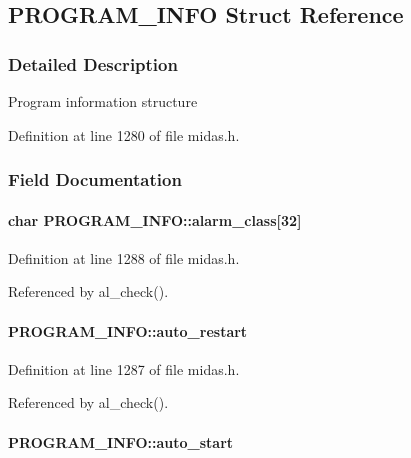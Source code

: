 \subsection{PROGRAM\_\-INFO Struct Reference}
\label{structPROGRAM__INFO}


\subsubsection{Detailed Description}
Program information structure 

Definition at line 1280 of file midas.h.

\subsubsection{Field Documentation}
\paragraph[{alarm\_\-class}]{\setlength{\rightskip}{0pt plus 5cm}char {\bf PROGRAM\_\-INFO::alarm\_\-class}\mbox{[}32\mbox{]}}\hfill\label{structPROGRAM__INFO_aa4bde5579c8584a3a8c5c436e95b1f17}


Definition at line 1288 of file midas.h.

Referenced by al\_\-check().
\paragraph[{auto\_\-restart}]{ {\bf PROGRAM\_\-INFO::auto\_\-restart}}\hfill\label{structPROGRAM__INFO_a7fa4d9e612b68c48ecf7204de63537d2}


Definition at line 1287 of file midas.h.

Referenced by al\_\-check().
\paragraph[{auto\_\-start}]{ {\bf PROGRAM\_\-INFO::auto\_\-start}}\hfill\label{structPROGRAM__INFO_a8fc313de7e51daa3d44f3e69fa8bab50}


